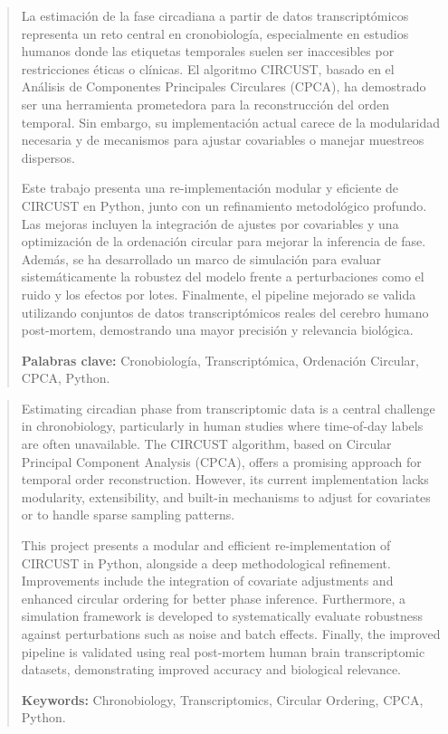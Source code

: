 \documentclass[12pt, a4paper]{report}
\begin{document}
\begin{abstract}
La estimación de la fase circadiana a partir de datos transcriptómicos representa un reto central en cronobiología, especialmente en estudios humanos donde las etiquetas temporales suelen ser inaccesibles por restricciones éticas o clínicas. El algoritmo CIRCUST, basado en el Análisis de Componentes Principales Circulares (CPCA), ha demostrado ser una herramienta prometedora para la reconstrucción del orden temporal. Sin embargo, su implementación actual carece de la modularidad necesaria y de mecanismos para ajustar covariables o manejar muestreos dispersos.

Este trabajo presenta una re-implementación modular y eficiente de CIRCUST en Python, junto con un refinamiento metodológico profundo. Las mejoras incluyen la integración de ajustes por covariables y una optimización de la ordenación circular para mejorar la inferencia de fase. Además, se ha desarrollado un marco de simulación para evaluar sistemáticamente la robustez del modelo frente a perturbaciones como el ruido y los efectos por lotes. Finalmente, el pipeline mejorado se valida utilizando conjuntos de datos transcriptómicos reales del cerebro humano post-mortem, demostrando una mayor precisión y relevancia biológica.

\textbf{Palabras clave:} Cronobiología, Transcriptómica, Ordenación Circular, CPCA, Python.
\end{abstract}

\renewcommand{\abstractname}{Abstract}
\begin{abstract}
Estimating circadian phase from transcriptomic data is a central challenge in chronobiology, particularly in human studies where time-of-day labels are often unavailable. The CIRCUST algorithm, based on Circular Principal Component Analysis (CPCA), offers a promising approach for temporal order reconstruction. However, its current implementation lacks modularity, extensibility, and built-in mechanisms to adjust for covariates or to handle sparse sampling patterns.

This project presents a modular and efficient re-implementation of CIRCUST in Python, alongside a deep methodological refinement. Improvements include the integration of covariate adjustments and enhanced circular ordering for better phase inference. Furthermore, a simulation framework is developed to systematically evaluate robustness against perturbations such as noise and batch effects. Finally, the improved pipeline is validated using real post-mortem human brain transcriptomic datasets, demonstrating improved accuracy and biological relevance.

\textbf{Keywords:} Chronobiology, Transcriptomics, Circular Ordering, CPCA, Python.
\end{abstract}
\end{document}
